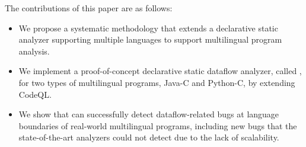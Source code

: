 The contributions of this paper are as follows:
\begin{itemize}
\item We propose a systematic methodology that extends a declarative static
analyzer supporting multiple languages to support multilingual program
analysis.

\item We implement a proof-of-concept declarative static dataflow analyzer,
called \ours, for two types of multilingual programs, Java-C and Python-C, by
extending CodeQL.

\item We show that \ours can successfully detect dataflow-related bugs at
language boundaries of real-world multilingual programs, including new bugs
that the state-of-the-art analyzers could not detect due to the lack of
scalability.

\end{itemize}
